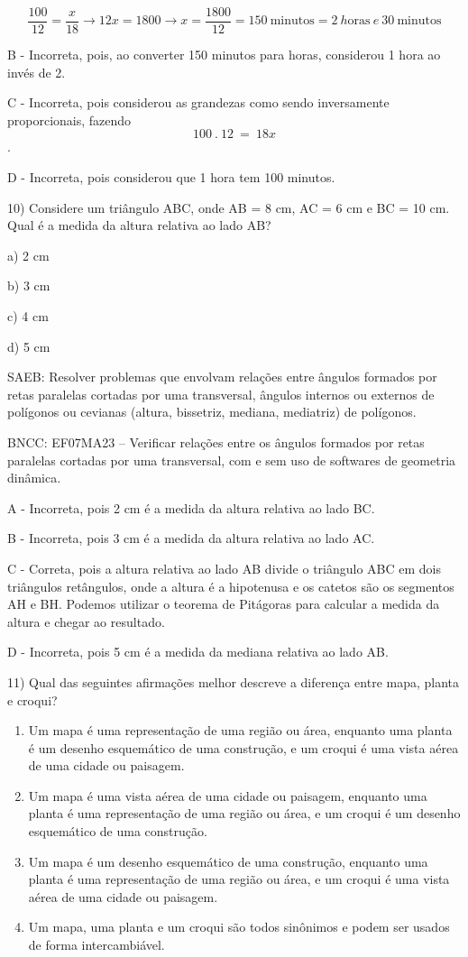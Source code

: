 \[\frac{100}{12} = \frac{x}{18} \rightarrow 12x = 1800 \rightarrow x = \frac{1800}{12} = 150\ \text{minutos} = 2\ h\text{oras}\ e\ 30\ \text{minutos}\]

B - Incorreta, pois, ao converter 150 minutos para horas, considerou 1
hora ao invés de 2.

C - Incorreta, pois considerou as grandezas como sendo inversamente
proporcionais, fazendo \[100\ .\ 12\  = \ 18x\].

D - Incorreta, pois considerou que 1 hora tem 100 minutos.

10) Considere um triângulo ABC, onde AB = 8 cm, AC = 6 cm e BC = 10 cm.
Qual é a medida da altura relativa ao lado AB?

a) 2 cm

b) 3 cm

c) 4 cm

d) 5 cm

SAEB: Resolver problemas que envolvam relações entre ângulos formados
por retas paralelas cortadas por uma transversal, ângulos internos ou
externos de polígonos ou cevianas (altura, bissetriz, mediana,
mediatriz) de polígonos.

BNCC: EF07MA23 -- Verificar relações entre os ângulos formados por retas
paralelas cortadas por uma transversal, com e sem uso de softwares de
geometria dinâmica.

A - Incorreta, pois 2 cm é a medida da altura relativa ao lado BC.

B - Incorreta, pois 3 cm é a medida da altura relativa ao lado AC.

C - Correta, pois a altura relativa ao lado AB divide o triângulo ABC em
dois triângulos retângulos, onde a altura é a hipotenusa e os catetos
são os segmentos AH e BH. Podemos utilizar o teorema de Pitágoras para
calcular a medida da altura e chegar ao resultado.

D - Incorreta, pois 5 cm é a medida da mediana relativa ao lado AB.

11) Qual das seguintes afirmações melhor descreve a diferença entre
mapa, planta e croqui?

\begin{enumerate}
\def\labelenumi{\alph{enumi})}
\item
  Um mapa é uma representação de uma região ou área, enquanto uma planta
  é um desenho esquemático de uma construção, e um croqui é uma vista
  aérea de uma cidade ou paisagem.
\item
  Um mapa é uma vista aérea de uma cidade ou paisagem, enquanto uma
  planta é uma representação de uma região ou área, e um croqui é um
  desenho esquemático de uma construção.
\item
  Um mapa é um desenho esquemático de uma construção, enquanto uma
  planta é uma representação de uma região ou área, e um croqui é uma
  vista aérea de uma cidade ou paisagem.
\item
  Um mapa, uma planta e um croqui são todos sinônimos e podem ser usados
  de forma intercambiável.
\end{enumerate}

